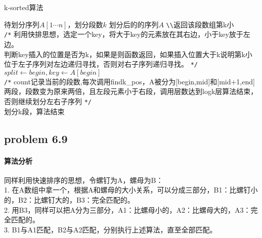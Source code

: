 \documentclass[11pt]{ctexart}
\begin{document}
	\begin{algorithm}
		\caption{k-sorted算法}
		\label{k-sorted}
		\begin{algorithmic}[1]
			\Require 待划分序列$A[1\cdots n]$，划分段数$k$
			\Ensure 划分后的的序列$A$
			 \verb|\\|返回该段数组第k小\\
			\verb|/*|
			利用快排思想，选定一个key，将大于key的元素放在其右边，小于key放于左边。\\
			判断key插入的位置是否为k，如果是则函数返回，如果插入位置大于k说明第k小位于左子序列对左边递归寻找，否则对右子序列递归寻找。
			\verb|*/|
			\State $split \gets begin,key \gets A[begin]$
			\EndFor
			\State {}
			\EndFunction
			\\
			\verb|/*|
			count记录当前的段数,每次调用findk\_pos，A被分为[begin,mid]和[mid+1,end]两段，段数变为原来两倍，且左段元素小于右段，调用层数达到logk层算法结束，否则继续划分左右子序列
			\verb|*/|
			\\划分k段，算法结束
			\State {}
			\EndIf
			\EndFunction
		\end{algorithmic}
	\end{algorithm}

	\newpage
	\subsection*{problem 6.9}
	\paragraph{算法分析}同样利用快速排序的思想，令螺钉为A，螺母为B：\\
	\hspace*{20pt}1. 在A数组中拿一个，根据A和螺母的大小关系，可以分成三部分，B1：比螺钉小的，B2：比螺钉大的，B3：完全匹配的。\\
	\hspace*{20pt}2. 用B3，同样可以把A分为三部分，A1：比螺母小的，A2：比螺母大的，A3：完全匹配的。\\
	\hspace*{20pt}3. B1与A1匹配，B2与A2匹配，分别执行上述算法，直至全部匹配。
\end{document}
